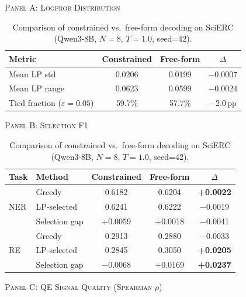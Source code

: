 \begin{table}[t]
\centering
\caption{Comparison of constrained vs.\ free-form decoding on SciERC (Qwen3-8B, $N{=}8$, $T{=}1.0$, seed=42).}
\label{tab:freeform-ablation}

\vspace{2pt}
{\small\textsc{Panel A: Logprob Distribution}}
\vspace{2pt}

\begin{tabular}{lccc}
\toprule
Metric & Constrained & Free-form & $\Delta$ \\
\midrule
Mean LP std        & 0.0206 & 0.0199 & $-$0.0007 \\
Mean LP range      & 0.0623 & 0.0599 & $-$0.0024 \\
Tied fraction ($\varepsilon{=}0.05$) & 59.7\% & 57.7\% & $-$2.0\,pp \\
\bottomrule
\end{tabular}

\vspace{8pt}

{\small\textsc{Panel B: Selection F1}}
\vspace{2pt}

\begin{tabular}{llccc}
\toprule
Task & Method & Constrained & Free-form & $\Delta$ \\
\midrule
\multirow{3}{*}{NER}
  & Greedy        & 0.6182 & 0.6204 & \textbf{+0.0022} \\
  & LP-selected   & 0.6241 & 0.6222 & $-$0.0019 \\
  & Selection gap & +0.0059 & +0.0018 & $-$0.0041 \\
\midrule
\multirow{3}{*}{RE}
  & Greedy        & 0.2913 & 0.2880 & $-$0.0033 \\
  & LP-selected   & 0.2845 & 0.3050 & \textbf{+0.0205} \\
  & Selection gap & $-$0.0068 & +0.0169 & \textbf{+0.0237} \\
\bottomrule
\end{tabular}

\vspace{8pt}

{\small\textsc{Panel C: QE Signal Quality (Spearman $\rho$)}}
\vspace{2pt}


\end{table}
